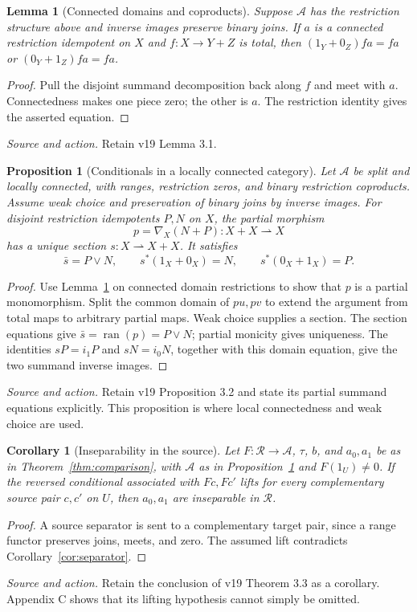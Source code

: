 \documentclass[11pt]{article}
\newtheorem{lemma}[theorem]{Lemma}
\newtheorem{proposition}[theorem]{Proposition}
\newtheorem{corollary}[theorem]{Corollary}
\theoremstyle{definition}\newtheorem{definition}[theorem]{Definition}
\newcommand{\ran}{\operatorname{ran}}
\newcommand{\R}{\mathscr R}
\newcommand{\A}{\mathcal A}
\newcommand{\source}[1]{\par\smallskip\noindent\textit{Source and action.} #1\par\smallskip}
\begin{document}
\begin{lemma}[Connected domains and coproducts]\label{lem:connected}
Suppose $\A$ has the restriction structure above and inverse images
preserve binary joins. If $a$ is a connected restriction idempotent
on $X$ and $f:X\to Y+Z$ is total, then
$(1_Y+0_Z)fa=fa$ or $(0_Y+1_Z)fa=fa$.
\end{lemma}
\begin{proof}
Pull the disjoint summand decomposition back along $f$ and meet
with $a$. Connectedness makes one piece zero; the other is $a$.
The restriction identity gives the asserted equation.
\end{proof}
\source{Retain v19 Lemma 3.1.}

\begin{proposition}[Conditionals in a locally connected category]\label{prop:conditionals}
Let $\A$ be split and locally connected, with ranges, restriction
zeros, and binary restriction coproducts. Assume weak choice and
preservation of binary joins by inverse images. For disjoint
restriction idempotents $P,N$ on $X$, the partial morphism
\[
 p=\nabla_X(N+P):X+X\rightharpoonup X
\]
has a unique section $s:X\rightharpoonup X+X$. It satisfies
\[
 \bar s=P\vee N,\qquad
 s^*(1_X+0_X)=N,\qquad s^*(0_X+1_X)=P.
\]
\end{proposition}
\begin{proof}
Use Lemma~\ref{lem:connected} on connected domain restrictions to
show that $p$ is a partial monomorphism. Split the common domain
of $pu,pv$ to extend the argument from total maps to arbitrary
partial maps. Weak choice supplies a section. The section equations
give $\bar s=\ran(p)=P\vee N$; partial monicity gives uniqueness.
The identities $sP=i_1P$ and $sN=i_0N$, together with this domain
equation, give the two summand inverse images.
\end{proof}
\source{Retain v19 Proposition 3.2 and state its partial summand equations explicitly. This proposition is where local connectedness and weak choice are used.}

\begin{corollary}[Inseparability in the source]\label{cor:source}
Let $F:\R\to\A$, $\tau$, $b$, and $a_0,a_1$ be as in
Theorem~\ref{thm:comparison}, with $\A$ as in
Proposition~\ref{prop:conditionals} and $F(1_U)\ne0$.
If the reversed conditional associated with $Fc,Fc'$ lifts for every
complementary source pair $c,c'$ on $U$, then $a_0,a_1$ are inseparable
in $\R$.
\end{corollary}
\begin{proof}
A source separator is sent to a complementary target pair, since
a range functor preserves joins, meets, and zero. The assumed lift
contradicts Corollary~\ref{cor:separator}.
\end{proof}
\source{Retain the conclusion of v19 Theorem 3.3 as a corollary. Appendix C shows that its lifting hypothesis cannot simply be omitted.}
\end{document}
